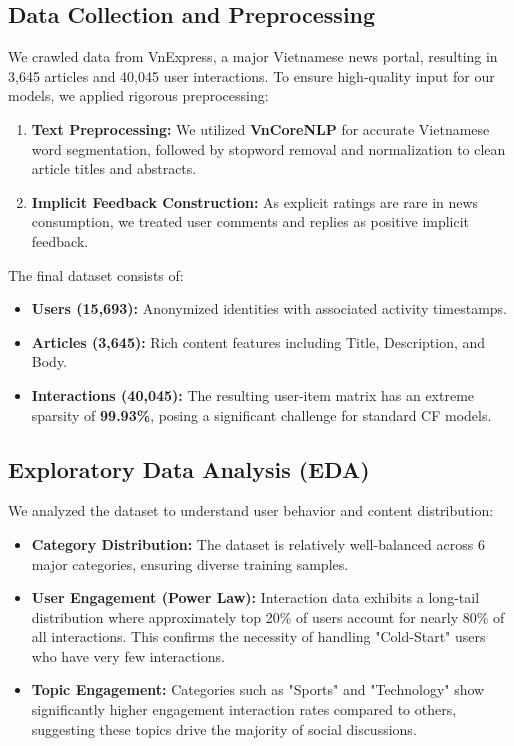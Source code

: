 \documentclass[11pt]{article}
\begin{document}
\subsection{Data Collection and Preprocessing}
We crawled data from VnExpress, a major Vietnamese news portal, resulting in 3,645 articles and 40,045 user interactions. To ensure high-quality input for our models, we applied rigorous preprocessing:
\begin{enumerate}
  \item \textbf{Text Preprocessing:} We utilized \textbf{VnCoreNLP} for accurate Vietnamese word segmentation, followed by stopword removal and normalization to clean article titles and abstracts.
  \item \textbf{Implicit Feedback Construction:} As explicit ratings are rare in news consumption, we treated user comments and replies as positive implicit feedback.
\end{enumerate}

The final dataset consists of:
\begin{itemize}
  \item \textbf{Users (15,693):} Anonymized identities with associated activity timestamps.
  \item \textbf{Articles (3,645):} Rich content features including Title, Description, and Body.
  \item \textbf{Interactions (40,045):} The resulting user-item matrix has an extreme sparsity of \textbf{99.93\%}, posing a significant challenge for standard CF models.
\end{itemize}

\subsection{Exploratory Data Analysis (EDA)}
We analyzed the dataset to understand user behavior and content distribution:
\begin{itemize}
  \item \textbf{Category Distribution:} The dataset is relatively well-balanced across 6 major categories, ensuring diverse training samples.
  \item \textbf{User Engagement (Power Law):} Interaction data exhibits a long-tail distribution where approximately top 20\% of users account for nearly 80\% of all interactions. This confirms the necessity of handling "Cold-Start" users who have very few interactions.
  \item \textbf{Topic Engagement:} Categories such as "Sports" and "Technology" show significantly higher engagement interaction rates compared to others, suggesting these topics drive the majority of social discussions.
\end{itemize}
\end{document}
